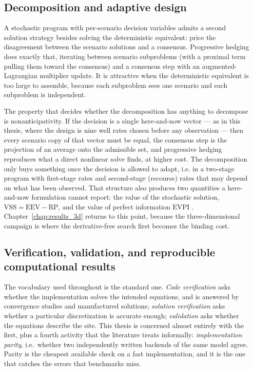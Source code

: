 \documentclass[11pt]{article}
\begin{document}
\subsection{Decomposition and adaptive design}

A stochastic program with per-scenario decision variables admits a second
solution strategy besides solving the deterministic equivalent: price the
disagreement between the scenario solutions and a consensus. Progressive
hedging \citep{rockafellar1991,watson2011} does exactly that, iterating between
scenario subproblems (with a proximal term pulling them toward the consensus)
and a consensus step with an augmented-Lagrangian multiplier update. It is
attractive when the deterministic equivalent is too large to assemble, because
each subproblem sees one scenario and each subproblem is independent.

The property that decides whether the decomposition has anything to decompose is
nonanticipativity. If the decision is a single here-and-now vector --- as in this
thesis, where the design is nine well rates chosen before any observation ---
then every scenario copy of that vector must be equal, the consensus step is the
projection of an average onto the admissible set, and progressive hedging
reproduces what a direct nonlinear solve finds, at higher cost. The decomposition
only buys something once the decision is allowed to adapt, i.e. in a two-stage
program with first-stage rates and second-stage (recourse) rates that may depend
on what has been observed. That structure also produces two quantities a
here-and-now formulation cannot report: the value of the stochastic solution,
$\mathrm{VSS} = \mathrm{EEV} - \mathrm{RP}$, and the value of perfect information
$\mathrm{EVPI}$ \citep{birge2011}. Chapter~\ref{chap:results_3d} returns to this
point, because the three-dimensional campaign is where the derivative-free search
first becomes the binding cost.

\subsection{Verification, validation, and reproducible computational results}

The vocabulary used throughout is the standard one. \emph{Code verification}
asks whether the implementation solves the intended equations, and is answered
by convergence studies and manufactured solutions; \emph{solution verification}
asks whether a particular discretization is accurate enough; \emph{validation}
asks whether the equations describe the site. This thesis is concerned almost
entirely with the first, plus a fourth activity that the literature treats
informally: \emph{implementation parity}, i.e.\ whether two independently written
backends of the same model agree. Parity is the cheapest available check on a
fast implementation, and it is the one that catches the errors that benchmarks
miss.
\end{document}
